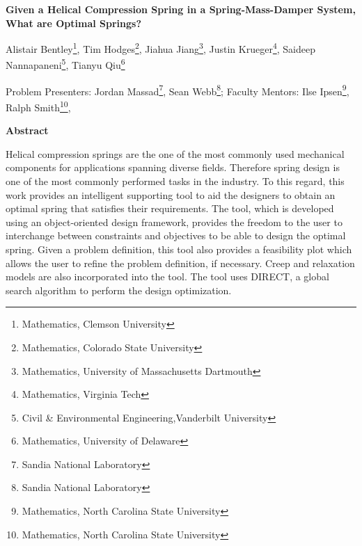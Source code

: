\documentclass[10pt]{article}
\begin{document}
\centerline{\large \bf Given a Helical Compression Spring in a Spring-Mass-Damper System, What are Optimal Springs?}

\vspace{.1truein}

\def\thefootnote{\arabic{footnote}}
\begin{center}
  
  Alistair Bentley\footnote{Mathematics, Clemson University},
   Tim Hodges\footnote{Mathematics, Colorado State University},
   Jiahua Jiang\footnote{Mathematics, University of Massachusetts Dartmouth },
  Justin Krueger\footnote{Mathematics, Virginia Tech},
  Saideep Nannapaneni\footnote{Civil \& Environmental Engineering,Vanderbilt University},
  Tianyu Qiu\footnote{Mathematics, University of Delaware}
   
\end{center}



\begin{center}
Problem Presenters: Jordan Massad\footnote{Sandia National Laboratory},
Sean Webb\footnote{Sandia National Laboratory};
	Faculty Mentors: Ilse Ipsen\footnote{Mathematics, North Carolina State University},
	Ralph Smith\footnote{Mathematics, North Carolina State University}, 
\end{center}


\vspace{.3truein}
\centerline{\bf Abstract}

Helical compression springs are the one of the most commonly used mechanical components for applications spanning diverse fields. Therefore spring design is one of the most commonly performed tasks in the industry. To this regard, this work provides an intelligent supporting tool to aid the designers to obtain an optimal spring that satisfies their requirements. The tool, which is developed using an object-oriented design framework, provides the freedom to the user to interchange between constraints and objectives to be able to design the optimal spring. Given a problem definition, this tool also provides a feasibility plot which allows the user to refine the problem definition, if necessary. Creep and relaxation models are also incorporated into the tool. The tool uses DIRECT, a global search algorithm to perform the design optimization.

\end{document}
